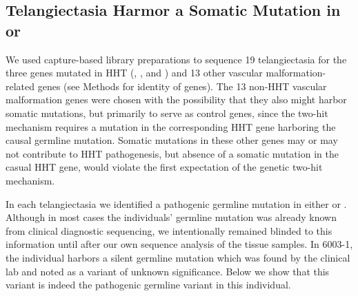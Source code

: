\subsection{Telangiectasia Harmor a Somatic Mutation in  or }
We used capture-based library preparations to sequence 19 telangiectasia for the three genes mutated in HHT (, , and ) and 13 other vascular malformation-related genes (see Methods for identity of genes). The 13 non-HHT vascular malformation genes were chosen with the possibility that they also might harbor somatic mutations, but primarily to serve as control genes, since the two-hit mechanism requires a mutation in the corresponding HHT gene harboring the causal germline mutation.  Somatic mutations in these other genes may or may not contribute to HHT pathogenesis, but absence of a somatic mutation in the casual HHT gene, would violate the first expectation of the genetic two-hit mechanism.

In each telangiectasia we identified a pathogenic germline mutation in either  or .   Although in most cases the individuals’ germline mutation was already known from clinical diagnostic sequencing, we intentionally remained blinded to this information until after our own sequence analysis of the tissue samples.  In 6003-1, the individual harbors a silent germline mutation which was found by the clinical lab and noted as a variant of unknown significance.  Below we show that this variant is indeed the pathogenic germline variant in this individual.

